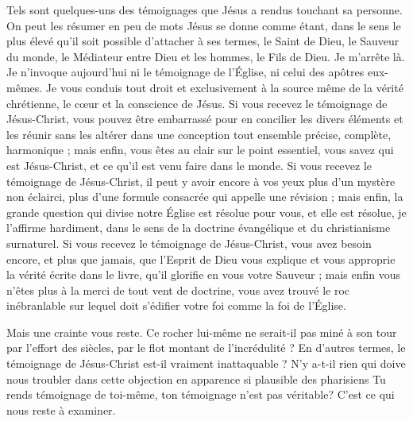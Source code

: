 Tels sont quelques-uns des témoignages que Jésus a rendus touchant sa personne. On peut les résumer en peu de mots\frcolon{} Jésus se donne comme étant, dans le sens le plus élevé qu’il soit possible d’attacher à ses termes, le Saint de Dieu, le Sauveur du monde, le Médiateur entre Dieu et les hommes, le Fils de Dieu. Je m’arrête là. Je n’invoque aujourd’hui ni le témoignage de l’Église, ni celui des apôtres eux-mêmes. Je vous conduis tout droit et exclusivement à la source même de la vérité chrétienne, le cœur et la conscience de Jésus. Si vous recevez le témoignage de Jésus-Christ, vous pouvez être embarrassé pour en concilier les divers éléments et les réunir sans les altérer dans une conception tout ensemble précise, complète, harmonique ; mais enfin, vous êtes au clair sur le point essentiel, vous savez qui est Jésus-Christ, et ce qu’il est venu faire dans le monde. Si vous recevez le témoignage de Jésus-Christ, il peut y avoir encore à vos yeux plus d’un mystère non éclairci, plus d’une formule consacrée qui appelle une révision ; mais enfin, la grande question qui divise notre Église est résolue pour vous, et elle est résolue, je l’affirme hardiment, dans le sens de la doctrine évangélique et du christianisme surnaturel. Si vous recevez le témoignage de Jésus-Christ, vous avez besoin encore, et plus que jamais, que l’Esprit de Dieu vous explique et vous approprie la vérité écrite dans le livre, qu’il glorifie en vous votre Sauveur ; mais enfin vous n’êtes plus à la merci de tout vent de doctrine, vous avez trouvé le roc inébranlable sur lequel doit s’édifier votre foi comme la foi de l’Église.

Mais une crainte vous reste. Ce rocher lui-même ne serait-il pas miné à son tour par l’effort des siècles, par le flot montant de l’incrédulité ? En d’autres termes, le témoignage de Jésus-Christ est-il vraiment inattaquable ? N’y a-t-il rien qui doive nous troubler dans cette objection en apparence si plausible des pharisiens\frcolon{} \Og{} Tu rends témoignage de toi-même, ton témoignage n’est pas véritable\Fg{}? C’est ce qui nous reste à examiner.

